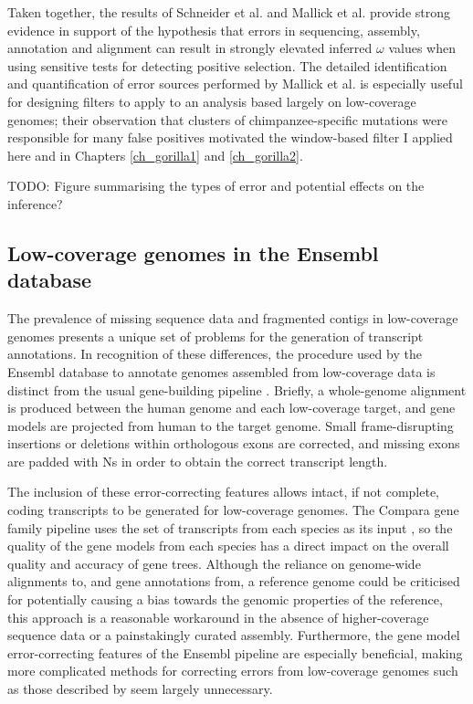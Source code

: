 Taken together, the results of Schneider et
al. \citeyearpar{Schneider2009Estimates} and Mallick et
al. \citeyearpar{Mallick2009Difficulty} provide strong evidence in
support of the hypothesis that errors in sequencing, assembly,
annotation and alignment can result in strongly elevated inferred
$\omega$ values when using sensitive tests for detecting positive
selection. The detailed identification and quantification of error
sources performed by Mallick et
al. \citeyearpar{Mallick2009Difficulty} is especially useful for
designing filters to apply to an analysis based largely on
low-coverage genomes; their observation that clusters of
chimpanzee-specific mutations were responsible for many false
positives motivated the window-based filter I applied here and in
Chapters \ref{ch_gorilla1} and \ref{ch_gorilla2}.

{\color{red} TODO: Figure summarising the types of error and potential effects on the inference?}

\subsection{Low-coverage genomes in the Ensembl database}

The prevalence of missing sequence data and fragmented contigs in
low-coverage genomes presents a unique set of problems for the
generation of transcript annotations. In recognition of these
differences, the procedure used by the Ensembl database to annotate
genomes assembled from low-coverage data is distinct from the usual
gene-building pipeline \citep{TODO, Ensembl 2006}. Briefly, a
whole-genome alignment is produced between the human genome and each
low-coverage target, and gene models are projected from human to the
target genome. Small frame-disrupting insertions or deletions within
orthologous exons are corrected, and missing exons are padded with Ns
in order to obtain the correct transcript length.

The inclusion of these error-correcting features allows intact, if not
complete, coding transcripts to be generated for low-coverage
genomes. The Compara gene family pipeline uses the set of transcripts
from each species as its input \citep{TODO, Ensembl Compara}, so the
quality of the gene models from each species has a direct impact on
the overall quality and accuracy of gene trees. Although the reliance
on genome-wide alignments to, and gene annotations from, a reference
genome could be criticised for potentially causing a bias towards the
genomic properties of the reference, this approach is a reasonable
workaround in the absence of higher-coverage sequence data or a
painstakingly curated assembly. Furthermore, the gene model error-correcting
features of the Ensembl pipeline are especially beneficial, making
more complicated methods for correcting errors from low-coverage
genomes such as those described by \citep{TODO, PLoS One hubisz and
  siepel} seem largely unnecessary.

